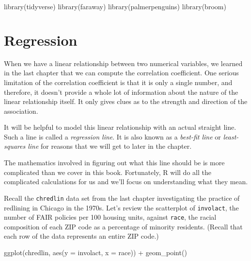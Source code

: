 \documentclass[
]{book}
\newenvironment{Shaded}{\begin{snugshade}}{\end{snugshade}}
\newcommand{\AttributeTok}[1]{\textcolor[rgb]{0.77,0.63,0.00}{#1}}
\newcommand{\FunctionTok}[1]{\textcolor[rgb]{0.00,0.00,0.00}{#1}}
\newcommand{\NormalTok}[1]{#1}
\newcommand{\SpecialCharTok}[1]{\textcolor[rgb]{0.00,0.00,0.00}{#1}}
\begin{document}
\begin{Shaded}
\begin{Highlighting}[]
\FunctionTok{library}\NormalTok{(tidyverse)}
\FunctionTok{library}\NormalTok{(faraway)}
\FunctionTok{library}\NormalTok{(palmerpenguins)}
\FunctionTok{library}\NormalTok{(broom)}
\end{Highlighting}
\end{Shaded}

\hypertarget{regression-regression}{%
\section{Regression}\label{regression-regression}}

When we have a linear relationship between two numerical variables, we learned in the last chapter that we can compute the correlation coefficient. One serious limitation of the correlation coefficient is that it is only a single number, and therefore, it doesn't provide a whole lot of information about the nature of the linear relationship itself. It only gives clues as to the strength and direction of the association.

It will be helpful to model this linear relationship with an actual straight line. Such a line is called a \emph{regression line}. It is also known as a \emph{best-fit line} or \emph{least-squares line} for reasons that we will get to later in the chapter.

The mathematics involved in figuring out what this line should be is more complicated than we cover in this book. Fortunately, R will do all the complicated calculations for us and we'll focus on understanding what they mean.

Recall the \texttt{chredlin} data set from the last chapter investigating the practice of redlining in Chicago in the 1970s. Let's review the scatterplot of \texttt{involact}, the number of FAIR policies per 100 housing units, against \texttt{race}, the racial composition of each ZIP code as a percentage of minority residents. (Recall that each row of the data represents an entire ZIP code.)

\begin{Shaded}
\begin{Highlighting}[]
\FunctionTok{ggplot}\NormalTok{(chredlin, }\FunctionTok{aes}\NormalTok{(}\AttributeTok{y =}\NormalTok{ involact, }\AttributeTok{x =}\NormalTok{ race)) }\SpecialCharTok{+}
    \FunctionTok{geom\_point}\NormalTok{()}
\end{Highlighting}
\end{Shaded}
\end{document}
